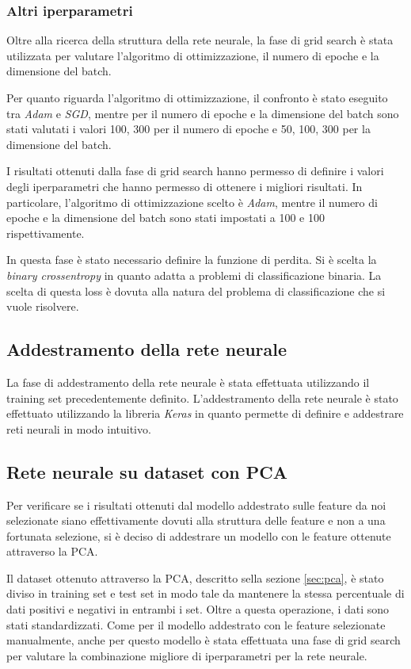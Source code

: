 \subsubsection{Altri iperparametri} %
Oltre alla ricerca della struttura della rete neurale, la fase di grid search è
stata utilizzata per valutare l'algoritmo di ottimizzazione, il numero di epoche
e la dimensione del batch.

Per quanto riguarda l'algoritmo di ottimizzazione, il confronto è stato eseguito
tra \textit{Adam} e \textit{SGD}, mentre per il numero di epoche e la dimensione
del batch sono stati valutati i valori 100, 300 per il numero di epoche e 50,
100, 300 per la dimensione del batch.

I risultati ottenuti dalla fase di grid search hanno permesso di definire i valori
degli iperparametri che hanno permesso di ottenere i migliori risultati. In
particolare, l'algoritmo di ottimizzazione scelto è \textit{Adam}, mentre il
numero di epoche e la dimensione del batch sono stati impostati a 100 e 100
rispettivamente.

In questa fase è stato necessario definire la funzione di perdita. Si è scelta
la \textit{binary crossentropy} in quanto adatta a problemi di classificazione
binaria. La scelta di questa loss è dovuta alla natura del problema di
classificazione che si vuole risolvere.
\subsection{Addestramento della rete neurale}
La fase di addestramento della rete neurale è stata effettuata utilizzando il
training set precedentemente definito. L'addestramento della rete neurale è stato
effettuato utilizzando la libreria \textit{Keras} in quanto permette di definire
e addestrare reti neurali in modo intuitivo.
\subsection{Rete neurale su dataset con PCA}
Per verificare se i risultati ottenuti dal modello addestrato sulle feature da
noi selezionate siano effettivamente dovuti alla struttura delle feature e non
a una fortunata selezione, si è deciso di addestrare un modello con le feature
ottenute attraverso la PCA.

Il dataset ottenuto attraverso la PCA, descritto sella sezione \ref{sec:pca}, è
stato diviso in training set e test set in modo tale da mantenere la stessa
percentuale di dati positivi e negativi in entrambi i set. Oltre a questa
operazione, i dati sono stati standardizzati.
Come per il modello addestrato con le feature selezionate manualmente, anche per
questo modello è stata effettuata una fase di grid search per valutare la
combinazione migliore di iperparametri per la rete neurale.

